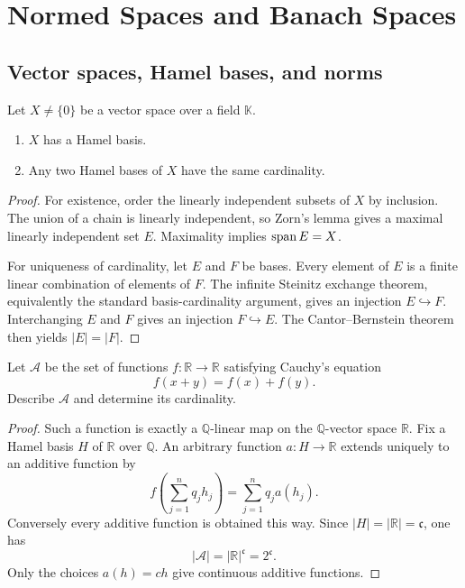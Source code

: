 \chapter{Normed Spaces and Banach Spaces}

\section{Vector spaces, Hamel bases, and norms}

\begin{notetheorem}
Let $X\ne\{0\}$ be a vector space over a field $\mathbb K$.
\begin{enumerate}
  \item $X$ has a Hamel basis.
  \item Any two Hamel bases of $X$ have the same cardinality.
\end{enumerate}
\end{notetheorem}

\begin{proof}
For existence, order the linearly independent subsets of $X$ by inclusion.
The union of a chain is linearly independent, so Zorn's lemma gives a maximal
linearly independent set $E$.  Maximality implies $\operatorname{span} E=X$.

For uniqueness of cardinality, let $E$ and $F$ be bases.  Every element of
$E$ is a finite linear combination of elements of $F$.  The infinite
Steinitz exchange theorem, equivalently the standard basis-cardinality
argument, gives an injection $E\hookrightarrow F$.  Interchanging $E$ and
$F$ gives an injection $F\hookrightarrow E$.  The Cantor--Bernstein theorem
then yields $|E|=|F|$.
\end{proof}

\begin{noteexercise}
Let $\mathcal A$ be the set of functions $f\colon\mathbb R\to\mathbb R$
satisfying Cauchy's equation
\[
  f(x+y)=f(x)+f(y).
\]
Describe $\mathcal A$ and determine its cardinality.
\end{noteexercise}

\begin{proof}
Such a function is exactly a $\mathbb Q$-linear map on the
$\mathbb Q$-vector space $\mathbb R$.  Fix a Hamel basis $H$ of
$\mathbb R$ over $\mathbb Q$.  An arbitrary function $a\colon H\to\mathbb R$
extends uniquely to an additive function by
\[
  f\!\left(\sum_{j=1}^n q_jh_j\right)=\sum_{j=1}^nq_ja(h_j).
\]
Conversely every additive function is obtained this way.  Since
$|H|=|\mathbb R|=\mathfrak c$, one has
\[
  |\mathcal A|=|\mathbb R|^{\mathfrak c}=2^{\mathfrak c}.
\]
Only the choices $a(h)=ch$ give continuous additive functions.
\end{proof}

